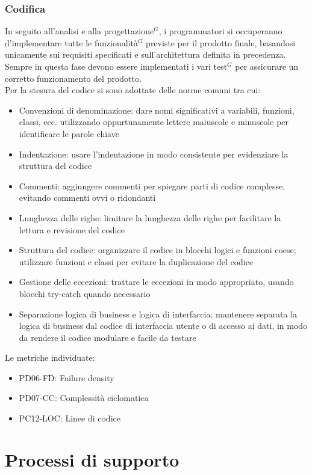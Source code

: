 \documentclass[a4paper,10pt]{article}
\begin{document}
\subsubsection{Codifica}
In seguito all'analisi e alla progettazione$^G$, i programmatori si occuperanno d'implementare tutte le funzionalità$^G$ 
previste per il prodotto finale, basandosi unicamente sui requisiti specificati e sull'architettura definita in precedenza. 
Sempre in questa fase devono essere implementati i vari test$^G$ per assicurare un corretto funzionamento del prodotto. \\
Per la stesura del codice si sono adottate delle norme comuni tra cui:
\begin{itemize}
  \item Convenzioni di denominazione: dare nomi significativi a variabili, funzioni, classi, ecc. utilizzando oppurtunamente lettere maiuscole e minuscole per identificare le parole chiave
  \item Indentazione: usare l'indentazione in modo consistente per evidenziare la struttura del codice
  \item Commenti: aggiungere commenti per spiegare parti di codice complesse, evitando commenti ovvi o ridondanti
  \item Lunghezza delle righe: limitare la lunghezza delle righe per facilitare la lettura e revisione del codice
  \item Struttura del codice: organizzare il codice in blocchi logici e funzioni coese; utilizzare funzioni e classi per evitare la duplicazione del codice
  \item Gestione delle eccezioni: trattare le eccezioni in modo appropriato, usando blocchi try-catch quando necessario
  \item Separazione logica di business e logica di interfaccia: mantenere separata la logica di business dal codice di interfaccia utente o di accesso ai dati, in modo da rendere il codice modulare e facile da testare
\end{itemize}
Le metriche individuate:
\begin{itemize}
  \item PD06-FD: Failure density
  \item PD07-CC: Complessità ciclomatica
  \item PC12-LOC: Linee di codice
\end{itemize}


\section{Processi di supporto}
\end{document}
